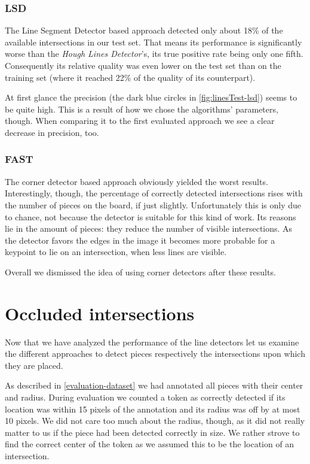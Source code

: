 	\subsubsection{LSD}
	\label{evaluation-visible-performance-lsd}
	The Line Segment Detector based approach detected only about 18\% of the available intersections in our test set. That means its performance is significantly worse than the \emph{Hough Lines Detector}'s, its true positive rate being only one fifth. Consequently its relative quality was even lower on the test set than on the training set (where it reached 22\% of the quality of its counterpart).

	At first glance the precision (the dark blue circles in \autoref{fig:linesTest-lsd}) seems to be quite high. This is a result of how we chose the algorithms' parameters, though. When comparing it to the first evaluated approach we see a clear decrease in precision, too.

	\subsubsection{FAST}
	\label{evaluation-visible-performance-fast}
	The corner detector based approach obviously yielded the worst results. Interestingly, though, the percentage of correctly detected intersections rises with the number of pieces on the board, if just slightly. Unfortunately this is only due to chance, not because the detector is suitable for this kind of work. Its reasons lie in the amount of pieces: they reduce the number of visible intersections. As the detector favors the edges in the image it becomes more probable for a keypoint to lie on an intersection, when less lines are visible.

	Overall we dismissed the idea of using corner detectors after these results.
	





	\section{Occluded intersections}
	\label{evaluation-occluded}
	Now that we have analyzed the performance of the line detectors let us examine the different approaches to detect pieces respectively the intersections upon which they are placed.

	As described in \autoref{evaluation-dataset} we had annotated all pieces with their center and radius. During evaluation we counted a token as correctly detected if its location was within 15 pixels of the annotation and its radius was off by at most 10 pixels. We did not care too much about the radius, though, as it did not really matter to us if the piece had been detected correctly in size. We rather strove to find the correct center of the token as we assumed this to be the location of an intersection.

